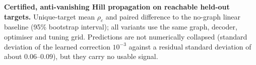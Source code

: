 \begin{table}[!ht]
\centering
\caption{\textbf{Certified, anti-vanishing Hill propagation on reachable held-out targets.} Unique-target mean $\rho_c$ and paired difference to the no-graph linear baseline (95\% bootstrap interval); all variants use the same graph, decoder, optimiser and tuning grid. Predictions are not numerically collapsed (standard deviation of the learned correction $10^{-3}$ against a residual standard deviation of about $0.06$--$0.09$), but they carry no usable signal.}
\label{tab:certhill}
\scriptsize

\end{table}
